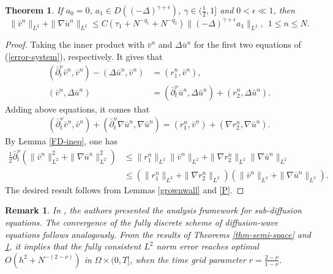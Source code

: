\documentclass[11pt]{article}
\newtheorem{theorem}{Theorem}
\newtheorem{remark}{Remark}[section]
\numberwithin{equation}{section}
\begin{document}
\begin{theorem}\label{thm-conv-1}
If $a_0=0$, $a_1\in D((-\Delta)^{\gamma+\epsilon})$, $\gamma\in(\frac{1}{2},1]$ and $0<\epsilon \ll 1$, then
\[
\|\bar v^n\|_{L^2}+\|\nabla \bar u^n\|_{L^2} \leq C(\tau_1+N^{-q_1}+N^{-q_2})\|(-\Delta)^{\gamma+\epsilon}a_1\|_{L^2},~~1\le n\le N.
\]
\end{theorem}
\begin{proof}
Taking the inner product with $\bar v^n$ and $\Delta \bar u^n$ for the first two equations of (\ref{error-system}), respectively. It gives that
\begin{align*}
(\bar\partial_t^\nu \bar v^n,\bar v^n) - (\Delta \bar u^n,\bar v^n) &= (r_1^n,\bar v^n), \\
(\bar v^n,\Delta \bar u^n)  &= (\bar\partial_t^\nu \bar u^n,\Delta \bar u^n)+(r_2^n,\Delta \bar u^n). 
\end{align*}
Adding above equations, it comes that
\begin{align*}
(\bar\partial_t^\nu \bar v^n,\bar v^n) + (\bar\partial_t^\nu \nabla \bar u^n,\nabla \bar u^n) = (r_1^n,\bar v^n)+(\nabla r_2^n,\nabla \bar u^n).
\end{align*}
By Lemma \ref{FD-ineq}, one has
\begin{align*}
\frac12\bar\partial_t^\nu (\|\bar v^n\|_{L^2}^2 + \|\nabla \bar u^n\|_{L^2}^2) &\le \|r_1^n\|_{L^2}\|\bar v^n\|_{L^2}+\|\nabla r_2^n\|_{L^2}\|\nabla \bar u^n\|_{L^2}\\
&\le (\|r_1^n\|_{L^2}+\|\nabla r_2^n\|_{L^2})(\|\bar v^n\|_{L^2}+\|\nabla \bar u^n\|_{L^2}).
\end{align*}
The desired result follows from Lemmas \ref{grownwall} and \ref{P}.
\end{proof}

\begin{remark}\label{re-error-R2}
In \cite{JinB2017sub_pod}, the authors presented the analysis framework for sub-diffusion equations. The convergence of the fully discrete scheme of diffusion-wave equations follows analogously. From the results of Theorems \ref{thm-semi-space} and \ref{thm-conv-1}, it implies that the fully consistent $L^2$ norm error reaches optimal $O(h^2+N^{-(2-\nu)})$ in $\Omega\times(0,T]$, when the time grid parameter $r=\frac{2-\nu}{1-\nu}$.
\end{remark}
\end{document}
